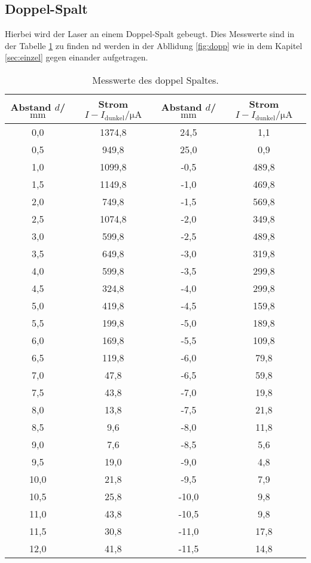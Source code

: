 \subsection{Doppel-Spalt}
Hierbei wird der Laser an einem Doppel-Spalt gebeugt. Dies Messwerte
sind in der Tabelle \ref{tab:dopp} zu finden
nd werden in der Abllidung \ref{fig:dopp} wie in dem Kapitel \ref{sec:einzel} gegen einander aufgetragen.
\begin{table}
  \centering
  \caption{Messwerte des doppel Spaltes.}
  \label{tab:dopp}
  \begin{tabular}{c c c c}
Abstand $d$/$\si{\milli\meter}$ & Strom $I-I_\mathrm{dunkel}/\si{\micro\ampere}$ & Abstand $d$/$\si{\milli\meter}$ & Strom $I-I_\mathrm{dunkel}/\si{\micro\ampere}$\\
    \midrule
    0,0 & 1374,8 & 24,5 & 1,1  \\
    0,5 & 949,8  & 25,0 & 0,9  \\
    1,0 & 1099,8 & -0,5 & 489,8\\
    1,5 & 1149,8 & -1,0 & 469,8\\
    2,0 & 749,8  & -1,5 & 569,8\\
    2,5 & 1074,8 & -2,0 & 349,8\\
    3,0 & 599,8  & -2,5 & 489,8\\
    3,5 & 649,8  & -3,0 & 319,8\\
    4,0 & 599,8  & -3,5 & 299,8\\
    4,5 & 324,8  & -4,0 & 299,8\\
    5,0 & 419,8  & -4,5 & 159,8\\
    5,5 & 199,8  & -5,0 & 189,8\\
    6,0 & 169,8  & -5,5 & 109,8\\
    6,5 & 119,8  & -6,0 & 79,8 \\
    7,0 & 47,8   & -6,5 & 59,8 \\
    7,5 & 43,8   & -7,0 & 19,8 \\
    8,0 & 13,8   & -7,5 & 21,8 \\
    8,5 & 9,6    & -8,0 & 11,8 \\
    9,0 & 7,6    & -8,5 & 5,6  \\
    9,5 & 19,0   & -9,0 & 4,8  \\
    10,0 & 21,8  & -9,5 & 7,9  \\
    10,5 & 25,8  & -10,0 & 9,8 \\
    11,0 & 43,8  & -10,5 & 9,8 \\
    11,5 & 30,8  & -11,0 & 17,8 \\
    12,0 & 41,8  & -11,5 & 14,8 \\

\end{tabular}
\end{table}

